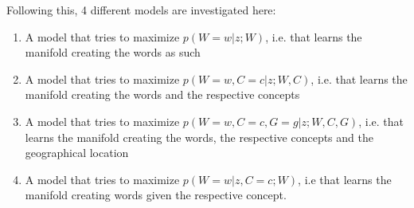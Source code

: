 \documentclass[6pt]{article}
\begin{document}
{%
%
%
%
%
%
%
%
%
%
%

%
%
%
%

Following this, 4 different models are investigated here:
\begin{enumerate}
\item A model that tries to maximize $p(W=w|z;W)$, i.e. that learns the manifold creating the words as such
\item A model that tries to maximize $p(W=w,C=c|z;W,C)$, i.e. that learns the manifold creating the words and the respective concepts
\item A model that tries to maximize $p(W=w,C=c,G=g|z;W,C,G)$, i.e. that learns the manifold creating the words, the respective concepts and the geographical location
\item A model that tries to maximize $p(W=w|z,C=c;W)$, i.e that learns the manifold creating words given the respective concept.
\end{enumerate}

}
\end{document}
